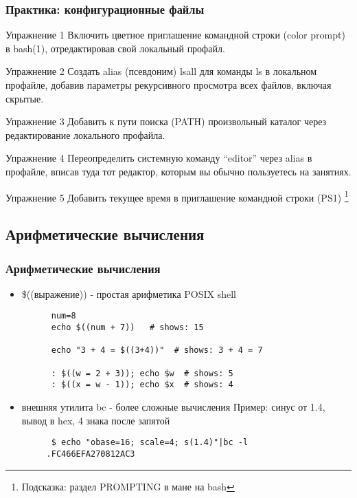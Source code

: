 \begin{frame}
  \frametitle{Практика: конфигурационные файлы}

  \alert{Упражнение 1} Включить цветное приглашение командной строки (color prompt) в bash(1), отредактировав свой локальный профайл.

  \alert{Упражнение 2} Создать alias (псевдоним) lsall для команды ls в локальном профайле, добавив параметры рекурсивного просмотра всех файлов, включая скрытые.

  \alert{Упражнение 3} Добавить к пути поиска (PATH) произвольный каталог через редактирование локального профайла.

  \alert{Упражнение 4} Переопределить системную команду ``editor'' через alias в профайле, вписав туда тот редактор, которым вы обычно пользуетесь на занятиях.

  \alert{Упражнение 5} Добавить текущее время в приглашение командной строки (PS1) \footnote{Подсказка: раздел PROMPTING в мане на bash}

\end{frame}

\subsection{Арифметические вычисления}
\begin{frame}[fragile]
  \frametitle{Арифметические вычисления}
  \begin{itemize}
    \item \alert{\$((выражение))} - простая арифметика POSIX shell 
      \begin{verbatim}
      num=8
      echo $((num + 7))   # shows: 15

      echo "3 + 4 = $((3+4))"  # shows: 3 + 4 = 7
      
      : $((w = 2 + 3)); echo $w  # shows: 5
      : $((x = w - 1)); echo $x  # shows: 4
      \end{verbatim} \pause
    \item внешняя утилита \alert{bc} - более сложные вычисления\newline
      Пример: синус от 1.4, вывод в hex, 4 знака после запятой
      \begin{verbatim}
      $ echo "obase=16; scale=4; s(1.4)"|bc -l 
     .FC466EFA270812AC3
      \end{verbatim}
  \end{itemize}

\end{frame}




